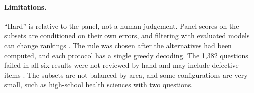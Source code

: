 \paragraph{Limitations.} ``Hard'' is relative to the panel, not a human
judgement. Panel scores on the subsets are conditioned on their own errors,
and filtering with evaluated models can change rankings
\citep{phang2022adversarially}. The rule was chosen after the alternatives
had been computed, and each protocol has a single greedy decoding. The 1,382
questions failed in all six results were not reviewed by hand and may
include defective items \citep{gema2025done}. The subsets are not balanced by
area, and some configurations are very small, such as high-school health
sciences with two questions.
